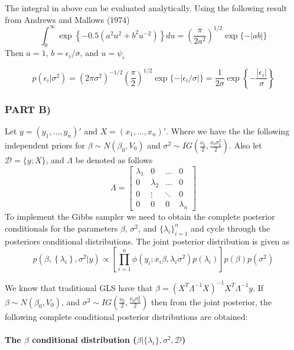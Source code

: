 \documentclass[
]{article}
\begin{document}
The integral in above can be evaluated analytically. Using the following
result from Andrews and Mallows (1974) \[
\int_{0}^{\infty} \exp \left\{-0.5\left(a^{2} u^{2}+b^{2} u^{-2}\right)\right\} d u=\left(\frac{\pi}{2 a^{2}}\right)^{1/2} \exp \{-|a b|\}
\] Then \(a=1\), \(b=\epsilon_i/\sigma\), and \(u = \psi_i\)

\[
p\left(\epsilon_{i} | \sigma^{2}\right)=\left(2 \pi \sigma^{2}\right)^{-1 / 2} \left(\frac{\pi}{2}\right)^{1/2} \exp\{-|\epsilon_i/\sigma|\} =\frac{1}{2\sigma} \exp\left\{-\frac{|\epsilon_i|}{\sigma}\right\}
\]

\hypertarget{part-b}{%
\subsubsection{PART B)}\label{part-b}}

Let \(y = (y_1, \dots, y_n)'\) and \(X = (x_1, \dots, x_n)'\). Where we
have the the following independent priors for
\(\beta \sim N(\beta_0, V_0)\) and
\(\sigma^2 \sim IG\left(\frac{\nu_0}{2}, \frac{\nu_0\sigma_0^2}{2}\right)\).
Also let \(\mathcal{D} = \{y;X\}\), and \(\Lambda\) be denoted as
follows \[
\Lambda  = \begin{bmatrix}\lambda_1 & 0 & \dots & 0 \\ 0 & \lambda_2 & \dots & 0 \\ 0 & \vdots & \ddots & 0 \\ 0 & 0 & 0 & \lambda_n \end{bmatrix}
\] To implement the Gibbs sampler we need to obtain the complete
posterior conditionals for the parameters \(\beta\), \(\sigma^2\), and
\(\{\lambda_i\}_{i=1}^{n}\) and cycle through the posteriors conditional
distributions. The joint posterior distribution is given as
\begin{equation}
p\left(\beta,\left\{\lambda_{i}\right\}, \sigma^{2} | y\right) \propto\left[\prod_{i=1}^{n} \phi\left(y_{i} ; x_{i} \beta, \lambda_{i} \sigma^{2}\right) p\left(\lambda_{i}\right)\right] p(\beta) p\left(\sigma^{2}\right)
\end{equation}

We know that traditional GLS have that
\(\beta = (X^T\Lambda^{-1}X)^{-1}X^T\Lambda^{-1}y\). If
\(\beta \sim N(\beta_0, V_0)\), and
\(\sigma^2 \sim IG\left(\frac{\nu_0}{2}, \frac{\nu_0 \sigma_0^2}{2}\right)\)
then from the joint posterior, the following complete conditional
posterior distributions are obtained:

\hypertarget{the-beta-conditional-distribution-beta-lambda_i-sigma2-mathcald}{%
\paragraph{\texorpdfstring{The \(\beta\) conditional distribution
(\(\beta | \{\lambda_i\}, \sigma^2, \mathcal{D}\))}{The \textbackslash beta conditional distribution (\textbackslash beta \textbar{} \textbackslash\{\textbackslash lambda\_i\textbackslash\}, \textbackslash sigma\^{}2, \textbackslash mathcal\{D\})}}\label{the-beta-conditional-distribution-beta-lambda_i-sigma2-mathcald}}
\end{document}
